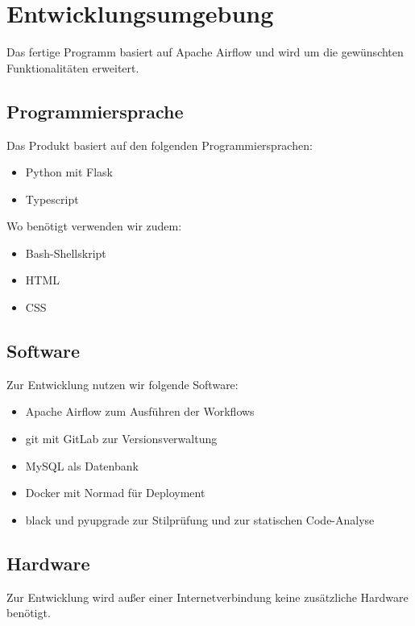 \chapter{Entwicklungsumgebung}
Das fertige Programm basiert auf Apache Airflow und wird um die gewünschten Funktionalitäten erweitert.
\section{Programmiersprache}
Das Produkt basiert auf den folgenden Programmiersprachen:
\begin{itemize}
    \setlength\itemsep{-1em}
    \item Python mit Flask
    \item Typescript
\end{itemize}
Wo benötigt verwenden wir zudem:
\begin{itemize}
    \setlength\itemsep{-1em}
    \item Bash-Shellskript 
    \item HTML
    \item CSS
\end{itemize}

\section{Software}
Zur Entwicklung nutzen wir folgende Software:
\begin{itemize}
    \setlength\itemsep{-1em}
    \item Apache Airflow zum Ausführen der Workflows
    \item git mit GitLab zur Versionsverwaltung
    \item MySQL als Datenbank
    \item Docker mit Normad für Deployment
    \item black und pyupgrade zur Stilprüfung und zur statischen Code-Analyse
\end{itemize}


\section{Hardware}
Zur Entwicklung wird außer einer Internetverbindung keine zusätzliche Hardware benötigt.